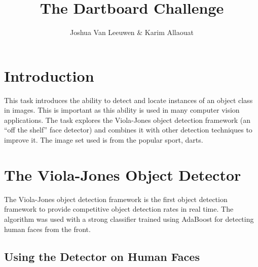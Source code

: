 \documentclass[a4paper]{article}
\title{The Dartboard Challenge}
\author{Joshua Van Leeuwen \& Karim Allaouat}
\begin{document}
\maketitle

\setcounter{section}{-1}
\section{Introduction}

This task introduces the ability to detect and locate instances of an object
class in images. This is important as this ability is used in many computer
vision applications. The task explores the Viola-Jones object detection
framework (an “off the shelf” face detector) and combines it with other
detection techniques to improve it. The image set used is from the popular
sport, darts.

\section{The Viola-Jones Object Detector}

The Viola-Jones object detection framework is the first object detection
framework to provide competitive object detection rates in real time. The
algorithm was used with a strong classifier trained using AdaBoost for
detecting human faces from the front.

\subsection{Using the Detector on Human Faces}
\end{document}

